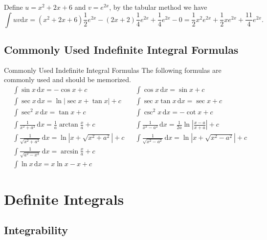 \begin{solution}
  Define $u = x^2 + 2x + 6$ and $v = e^{2x}$,
  by the tabular method we have
  \begin{equation}
    \int u v \mathrm{d} x = (x^2 + 2x + 6) \frac{1}{2}e^{2x} - (2x + 2) \frac{1}{4}e^{2x}
    + \frac{1}{4} e^{2x} - 0 = \frac{1}{2}x^2 e^{2x} + \frac{1}{2} xe^{2x} + \frac{11}{4}e^{2x}.
  \end{equation}
\end{solution}

\subsection{Commonly Used Indefinite Integral Formulas}

\begin{proposition}{Commonly Used Indefinite Integral Formulas}{}
  The following formulas are commonly used and should be memorized.
  \begin{align}
      &\int \sin x \, \mathrm{d}x = -\cos x + c 
      && \int \cos x \, \mathrm{d}x = \sin x + c \\
      &\int \sec x \, \mathrm{d}x = \ln|\sec x + \tan x| + c 
      && \int \sec x \tan x \, \mathrm{d}x = \sec x + c \\
      &\int \sec^2 x \, \mathrm{d}x = \tan x + c 
      && \int \csc^2 x \, \mathrm{d}x = -\cot x + c \\
      &\int \frac{1}{x^2 + a^2} \, \mathrm{d}x = \frac{1}{a} \arctan \frac{x}{a} + c 
      && \int \frac{1}{x^2 - a^2} \, \mathrm{d}x = \frac{1}{2a} \ln \left| \frac{x-a}{x+a} \right| + c \\
      &\int \frac{1}{\sqrt{x^2 + a^2}} \, \mathrm{d}x = \ln \left| x + \sqrt{x^2 + a^2} \right| + c 
      && \int \frac{1}{\sqrt{x^2 - a^2}} \, \mathrm{d}x = \ln \left| x + \sqrt{x^2 - a^2} \right| + c \\
      &\int \frac{1}{\sqrt{a^2 - x^2}} \, \mathrm{d}x = \arcsin \frac{x}{a} + c 
      && {} \\
      &\int \ln x \, \mathrm{d}x = x \ln x - x + c 
      && {}
  \end{align}
\end{proposition}

\section{Definite Integrals}

\subsection{Integrability}

